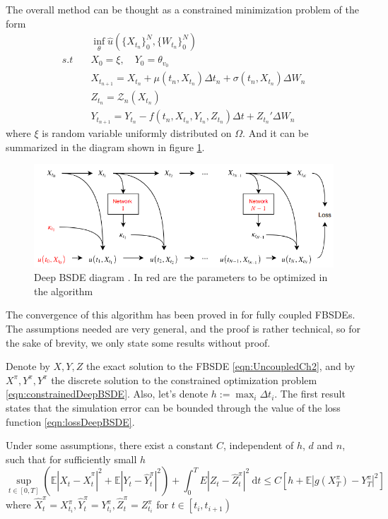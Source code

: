 The overall method can be thought as a constrained minimization problem of the form
\begin{equation}
	\label{eqn:constrainedDeepBSDE}
	\begin{split}
		&\inf_{\theta}\hat{u}(\{X_{t_n}\}_{0}^{N},\{W_{t_n}\}_{0}^{N})\\
		s.t \quad & X_0=\xi ,\quad Y_0=\theta_{v_0}\\
		& 		X_{t_{n+1}} = X_{t_n} +\mu\left(t_n, X_{t_n}\right) \Delta t_n+\sigma\left(t_n, X_{t_n}\right) \Delta W_n\\
		&Z_{t_n}=\mathcal{Z}_n(X_{t_n})\\
		&Y_{t_{n+1}}=Y_{t_n}-f(t_n,X_{t_n},Y_{t_n},Z_{t_n})\Delta t +Z_{t_n}'\Delta W_{n}
	\end{split}
\end{equation}
where $\xi$ is random variable uniformly distributed on $\Omega$. And it can be summarized in the diagram shown in figure \ref{fig:deepbsdemap}.
\begin{figure}[H]
	\centering
	\includegraphics[width=\linewidth]{images/DeepBSDEMap}
	\caption{Deep BSDE diagram \cite{chan-wai-nam_machine_2018}. In red are the parameters to be optimized in the algorithm }
	\label{fig:deepbsdemap}
\end{figure}

The convergence of this algorithm has been proved in \cite{han_convergence_2020} for fully coupled FBSDEs. The assumptions needed are very general, and the proof is rather technical, so for the sake of brevity, we only state some results without proof.

Denote by $X,Y,Z$ the exact solution to the FBSDE \eqref{eqn:UncoupledCh2}, and by $X^\pi,Y^\pi,Y^\pi$ the discrete solution to the constrained optimization problem \eqref{eqn:constrainedDeepBSDE}. Also, let's denote $h:=\max_{i}\Delta t_i$. The first result states that the simulation error can be bounded through the value of the loss function \eqref{eqn:lossDeepBSDE}.
\begin{theorem}
	Under some assumptions, there exist a constant $C$, independent of $h$, $d$ and $n$, such that for sufficiently small $h$
	$$
	\sup _{t \in[0, T]}\left(\mathbb{E}\left|X_t-\hat{X}_t^\pi\right|^2+\mathbb{E}\left|Y_t-\hat{Y}_t^\pi\right|^2\right)+\int_0^T E\left|Z_t-\hat{Z}_t^\pi\right|^2 \mathrm{~d} t \leq C\left[h+\mathbb{E}\left|g\left(X_T^\pi\right)-Y_T^\pi\right|^2\right]
	$$
	where $\hat{X}_t^\pi=X_{t_i}^\pi, \hat{Y}_t^\pi=Y_{t_i}^\pi, \hat{Z}_t^\pi=Z_{t_i}^\pi$ for $t \in\left[t_i, t_{i+1}\right)$
\end{theorem}   

